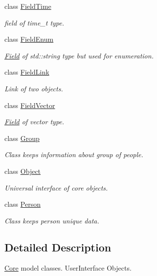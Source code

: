 \begin{DoxyCompactItemize}
class \hyperlink{classCore_1_1FieldTime}{FieldTime}
\begin{DoxyCompactList}\small\item\em field of time\_\-t type. \item\end{DoxyCompactList}\item 
class \hyperlink{classCore_1_1FieldEnum}{FieldEnum}
\begin{DoxyCompactList}\small\item\em \hyperlink{classCore_1_1Field}{Field} of std::string type but used for enumeration. \item\end{DoxyCompactList}\item 
class \hyperlink{classCore_1_1FieldLink}{FieldLink}
\begin{DoxyCompactList}\small\item\em Link of two objects. \item\end{DoxyCompactList}\item 
class \hyperlink{classCore_1_1FieldVector}{FieldVector}
\begin{DoxyCompactList}\small\item\em \hyperlink{classCore_1_1Field}{Field} of vector type. \item\end{DoxyCompactList}\item 
class \hyperlink{classCore_1_1Group}{Group}
\begin{DoxyCompactList}\small\item\em Class keeps information about group of people. \item\end{DoxyCompactList}\item 
class \hyperlink{classCore_1_1Object}{Object}
\begin{DoxyCompactList}\small\item\em Universal interface of core objects. \item\end{DoxyCompactList}\item 
class \hyperlink{classCore_1_1Person}{Person}
\begin{DoxyCompactList}\small\item\em Class keeps person unique data. \item\end{DoxyCompactList}\end{DoxyCompactItemize}


\subsection{Detailed Description}
\hyperlink{namespaceCore}{Core} model classes. UserInterface Objects. 